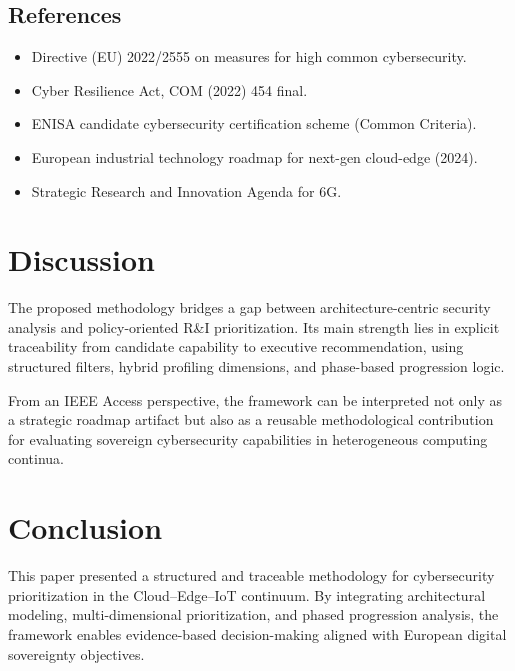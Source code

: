 \documentclass{ieeeaccess}
\begin{document}
\subsection{References}
\begin{itemize}[leftmargin=1.5cm, labelsep=0.2cm]
    \item[{[NIS2]}] Directive (EU) 2022/2555 on measures for high common cybersecurity.
    \item[{[CRA]}] Cyber Resilience Act, COM (2022) 454 final.
    \item[{[EUCC]}] ENISA candidate cybersecurity certification scheme (Common Criteria).
    \item[{[Cloud-Edge]}] European industrial technology roadmap for next-gen cloud-edge (2024).
    \item[{[SNS JU]}] Strategic Research and Innovation Agenda for 6G.
\end{itemize}

\fi

\section{Discussion}

The proposed methodology bridges a gap between architecture-centric security analysis and policy-oriented R\&I prioritization. Its main strength lies in explicit traceability from candidate capability to executive recommendation, using structured filters, hybrid profiling dimensions, and phase-based progression logic.

From an IEEE Access perspective, the framework can be interpreted not only as a strategic roadmap artifact but also as a reusable methodological contribution for evaluating sovereign cybersecurity capabilities in heterogeneous computing continua.

\section{Conclusion}

This paper presented a structured and traceable methodology for cybersecurity prioritization in the Cloud--Edge--IoT continuum. By integrating architectural modeling, multi-dimensional prioritization, and phased progression analysis, the framework enables evidence-based decision-making aligned with European digital sovereignty objectives.
\end{document}
